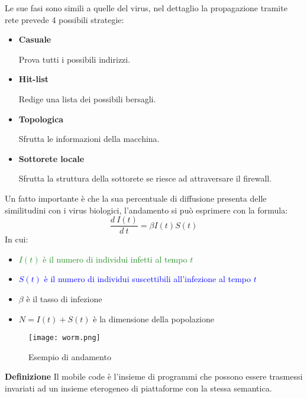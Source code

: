 \documentclass{article}
\newcommand{\df}[1]{\noindent\textbf{Definizione } #1.\newline}
\begin{document}
\noindent Le sue fasi sono simili a quelle del virus, nel dettaglio la propagazione tramite rete prevede 4 possibili strategie:
\begin{itemize}
    \item \textbf{Casuale}

        Prova tutti i possibili indirizzi.
    
    \item \textbf{Hit-list}

        Redige una lista dei possibili bersagli.
    
    \item \textbf{Topologica}

        Sfrutta le informazioni della macchina.
    
    \item \textbf{Sottorete locale}

        Sfrutta la struttura della sottorete se riesce ad attraversare il firewall.
    
\end{itemize}

\newpage

\noindent Un fatto importante è che la sua percentuale di diffusione presenta delle similitudini con i virus biologici, l'andamento si può esprimere con la formula:
$$\frac{d\ I(t)}{d\ t}=\beta I(t)S(t)$$
\noindent In cui:
\begin{itemize}
    \item \textcolor{ForestGreen}{$I(t)$ è il numero di individui infetti al tempo $t$}
    \item \textcolor{Blue}{$S(t)$ è il numero di individui suscettibili all'infezione al tempo $t$}
    \item $\beta$ è il tasso di infezione
    \item $N=I(t)+S(t)$ è la dimensione della popolazione\newline
\end{itemize}

\begin{figure}[ht]
    \centering
    \texttt{[image: worm.png]}
    \caption{Esempio di andamento}
\end{figure}

\vspace{5pt}

\df{Il mobile code è l'insieme di programmi che possono essere trasmessi invariati ad un insieme eterogeneo di piattaforme con la stessa semantica}
\end{document}
